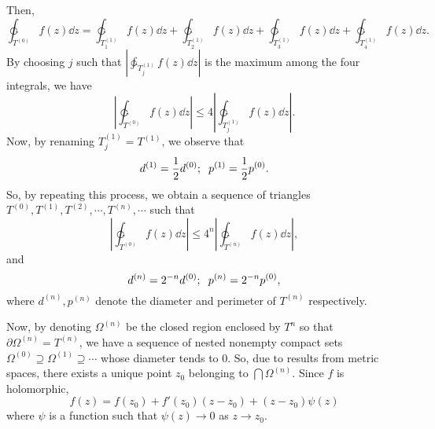 \documentclass[
]{article}
\theoremstyle{definition}
\theoremstyle{definition}
\begin{document}
\begin{center}
\end{center}

Then, \[\ointctrclockwise_{T^{(0)}} f(z) \dd z = 
  \ointctrclockwise_{T_1^{(1)}} f(z) \dd z + \ointctrclockwise_{T_2^{(1)}} f(z) \dd z
  + \ointctrclockwise_{T_3^{(1)}} f(z) \dd z + \ointctrclockwise_{T_4^{(1)}} f(z) \dd z.\]
By choosing \(j\) such that
\(\left|\ointctrclockwise_{T_j^{(1)}} f(z) \dd z\right|\) is the maximum
among the four integrals, we have
\[\left|\ointctrclockwise_{T^{(0)}} f(z) \dd z\right| 
  \le 4\left|\ointctrclockwise_{T_j^{(1)}} f(z) \dd z\right|.\] Now, by
renaming \(T_j^{(1)} = T^{(1)}\), we observe that
\[d^{(1)} = \frac{1}{2}d^{(0)}; \hspace{2mm} p^{(1)} = \frac{1}{2}p^{(0)}.\]
So, by repeating this process, we obtain a sequence of triangles
\(T^{(0)}, T^{(1)}, T^{(2)}, \cdots, T^{(n)}, \cdots\) such that
\[\left|\ointctrclockwise_{T^{(0)}} f(z) \dd z\right| 
  \le 4^n\left|\ointctrclockwise_{T^{(n)}} f(z) \dd z\right|,\] and
\[d^{(n)} = 2^{-n} d^{(0)}; \hspace{2mm} p^{(n)} = 2^{-n} p^{(0)},\]
where \(d^{(n)}, p^{(n)}\) denote the diameter and perimeter of
\(T^{(n)}\) respectively.

Now, by denoting \(\Omega^{(n)}\) be the closed region enclosed by
\(T^{n}\) so that \(\partial \Omega^{(n)} = T^{(n)}\), we have a
sequence of nested nonempty compact sets
\(\Omega^{(0)} \supseteq \Omega^{(1)} \supseteq \cdots\) whose diameter
tends to 0. So, due to results from metric spaces, there exists a unique
point \(z_0\) belonging to \(\bigcap \Omega^{(n)}\). Since \(f\) is
holomorphic, \[f(z) = f(z_0) + f'(z_0)(z - z_0) + (z - z_0) \psi(z)\]
where \(\psi\) is a function such that \(\psi(z) \to 0\) as
\(z \to z_0\).
\end{document}
